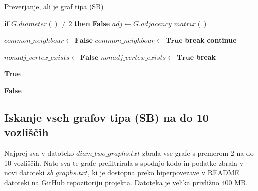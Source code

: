 \documentclass{article}
\begin{document}
\begin{algorithm}
\caption{Preverjanje, ali je graf tipa (SB)}
\begin{algorithmic}[1]
 
    \State \textbf{if} $G.diameter() \neq 2$ \textbf{then} \Return \textbf{False} 
    \State $adj \gets G.adjacency\_matrix()$ 

         
             
                \State $common\_neighbour \gets \textbf{False}$
                     
                        \State $common\_neighbour \gets \textbf{True}$
                        \State \textbf{break}
                    \EndIf
                \EndFor
                    \State \textbf{continue}
                \EndIf

                \State $nonadj\_vertex\_exists \gets \textbf{False}$
                        \State $nonadj\_vertex\_exists \gets \textbf{True}$
                        \State \textbf{break}
                    \EndIf
                \EndFor

                    \State \Return \textbf{True}
                \EndIf
            \EndIf
        \EndFor
    \EndFor

    \State \Return \textbf{False} 
\EndFunction
\end{algorithmic}
\end{algorithm}


\subsection{Iskanje vseh grafov tipa (SB) na do 10 vozliščih}

Najprej sva v datoteko $diam\_two\_graphs.txt$ zbrala vse grafe s premerom 2 na do 10 vozliščih.
Nato sva te grafe prefiltrirala s spodnjo kodo in podatke zbrala v novi datoteki 
$sb\_graphs.txt$, ki je dostopna preko hiperpovezave v README datoteki na GitHub repozitoriju projekta.
Datoteka je velika privližno 400 MB.
\end{document}
